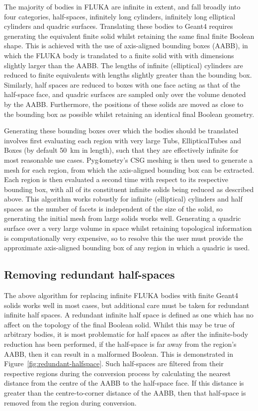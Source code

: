 \documentclass[final,5p,times,twocolumn]{elsarticle}
\begin{document}
The majority of bodies in FLUKA are infinite in extent, and fall
broadly into four categories, half-spaces, infinitely long cylinders,
infinitely long elliptical cylinders and quadric surfaces.
Translating these bodies to Geant4 requires generating the equivalent
finite solid whilst retaining the same final finite Boolean shape.
This is achieved with the use of axis-aligned bounding boxes (AABB),
in which the FLUKA body is translated to a finite solid with with
dimensions slightly larger than the AABB.  The lengths of infinite
(elliptical) cylinders are reduced to finite equivalents with lengths
slightly greater than the bounding box.  Similarly, half spaces are
reduced to boxes with one face acting as that of the half-space face,
and quadric surfaces are sampled only over the volume denoted by the
AABB.  Furthermore, the positions of these solids are moved as close
to the bounding box as possible whilst retaining an identical final
Boolean geometry.

Generating these bounding boxes over which the bodies should be
translated involves first evaluating each region with very large Tubs,
EllipticalTubes and Boxes (by default \SI{50}{\km} in length), such
that they are effectively infinite for most reasonable use cases.
Pyg4ometry's CSG meshing is then used to generate a mesh for each
region, from which the axis-aligned bounding box can be extracted.
Each region is then evaluated a second time with respect to its
respective bounding box, with all of its constituent infinite solids
being reduced as described above.  This algorithm works robustly for
infinite (elliptical) cylinders and half spaces as the number of
facets is independent of the size of the solid, so generating the
initial mesh from large solids works well.  Generating a quadric
surface over a very large volume in space whilst retaining topological
information is computationally very expensive, so to resolve this the
user must provide the approximate axis-aligned bounding box of any
region in which a quadric is used.

\subsection{Removing redundant half-spaces}

The above algorithm for replacing infinite FLUKA bodies with finite
Geant4 solids works well in most cases, but additional care must be
taken for redundant infinite half spaces.  A redundant infinite half
space is defined as one which has no affect on the topology of the
final Boolean solid.  Whilst this may be true of arbitrary bodies, it
is most problematic for half spaces as after the infinite-body
reduction has been performed, if the half-space is far away from the
region's AABB, then it can result in a malformed Boolean.  This is
demonstrated in Figure~\ref{fig:redundant-halfspace}.  Such
half-spaces are filtered from their respective regions during the
conversion process by calculating the nearest distance from the centre
of the AABB to the half-space face.  If this distance is greater than
the centre-to-corner distance of the AABB, then that half-space is
removed from the region during conversion.
\end{document}
